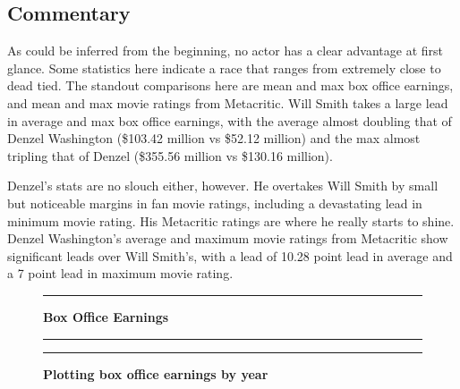 \documentclass[]{article}
\begin{document}
\newpage

\subsection{Commentary}
\label{sec:summary-commentary}

As could be inferred from the beginning, no actor has a clear advantage
at first glance. Some statistics here indicate a race that ranges from
extremely close to dead tied. The standout comparisons here are mean and
max box office earnings, and mean and max movie ratings from Metacritic.
Will Smith takes a large lead in average and max box office earnings,
with the average almost doubling that of Denzel Washington (\$103.42
million vs \$52.12 million) and the max almost tripling that of Denzel
(\$355.56 million vs \$130.16 million).

Denzel's stats are no slouch either, however. He overtakes Will Smith by
small but noticeable margins in fan movie ratings, including a
devastating lead in minimum movie rating. His Metacritic ratings are
where he really starts to shine. Denzel Washington's average and maximum
movie ratings from Metacritic show significant leads over Will Smith's,
with a lead of 10.28 point lead in average and a 7 point lead in maximum
movie rating.

\newpage

\begin{figure}[!ht]
    \hrule
    \caption{ \textbf{Box Office Earnings} }
    \begin{center}
    \end{center}
    \label{fig:box-office}
  \hrule
  \vspace{2.5mm}
      \caption{\textbf{ Plotting box office earnings by year }   }
      \label{fig:combined}
  \vspace{-2.5mm}
  \hrule
\end{figure}
\end{document}
